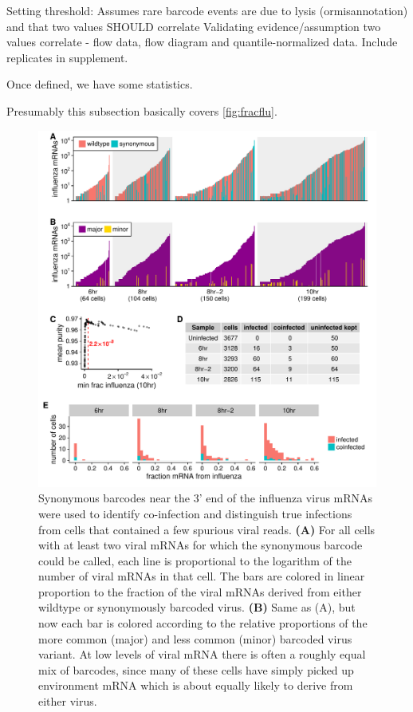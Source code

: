 \documentclass[9pt,lineno]{elife}
\begin{document}
Setting threshold: Assumes rare barcode events are due to lysis (ormisannotation)  and that two values SHOULD correlate
Validating evidence/assumption two values correlate - flow data, flow diagram and quantile-normalized data. Include replicates in supplement.

Once defined, we have some statistics.

Presumably this subsection basically covers \ref{fig:fracflu}.

\begin{figure}
\includegraphics[width=\linewidth]{figures/p_frac_flu_summary.pdf}
\caption{
Synonymous barcodes near the 3' end of the influenza virus mRNAs were used to identify co-infection and distinguish true infections from cells that contained a few spurious viral reads.
{\bf (A)}
For all cells with at least two viral mRNAs for which the synonymous barcode could be called, each line is proportional to the logarithm of the number of viral mRNAs in that cell.
The bars are colored in linear proportion to the fraction of the viral mRNAs derived from either wildtype or synonymously barcoded virus.
{\bf (B)}
Same as (A), but now each bar is colored according to the relative proportions of the more common (major) and less common (minor) barcoded virus variant.
At low levels of viral mRNA there is often a roughly equal mix of barcodes, since many of these cells have simply picked up environment mRNA which is about equally likely to derive from either virus.
}
\end{figure}
\end{document}
